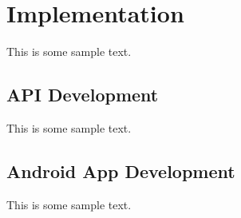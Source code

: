 \chapter{Implementation}

This is some sample text.

\section{API Development}

This is some sample text.

\section{Android App Development}

This is some sample text.